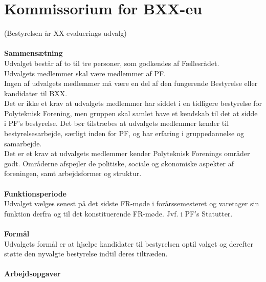 \section{Kommissorium for BXX-eu}
(Bestyrelsen år XX evaluerings udvalg)\\
\\
\textbf{Sammensætning}\\
Udvalget består af to til tre personer, som godkendes af Fællesrådet.\\
Udvalgets medlemmer skal være medlemmer af PF.\\
Ingen af udvalgets medlemmer må være en del af den fungerende Bestyrelse eller kandidater til BXX.\\
Det er ikke et krav at udvalgets medlemmer har siddet i en tidligere bestyrelse for Polyteknisk Forening, men gruppen skal samlet have et kendskab til det at sidde i PF’s bestyrelse. Det bør tilstræbes at udvalgets medlemmer kender til bestyrelsesarbejde, særligt inden for PF, og har erfaring i gruppedannelse og samarbejde.\\
Det er et krav at udvalgets medlemmer kender Polyteknisk Forenings områder godt. Områderne afspejler de politiske, sociale og økonomiske aspekter af foreningen, samt arbejdsformer og struktur.\\
\\
\textbf{Funktionsperiode}\\
Udvalget vælges senest på det sidste FR-møde i forårssemesteret og varetager sin funktion derfra og til det konstituerende FR-møde. Jvf.  i PF's Statutter.\\
\\
\textbf{Formål}\\
Udvalgets formål er at hjælpe kandidater til bestyrelsen optil valget og derefter støtte den nyvalgte bestyrelse indtil
deres tiltræden.
\\
\\
\textbf{Arbejdsopgaver}
